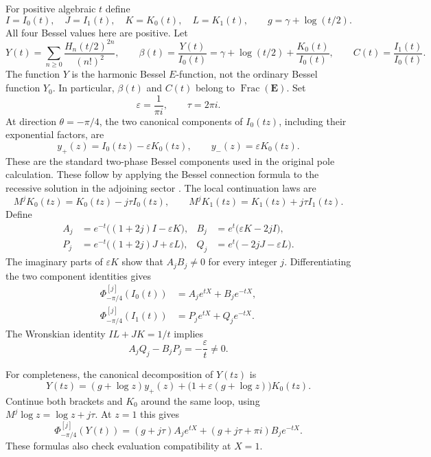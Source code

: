 \documentclass[11pt]{article}
\theoremstyle{definition}
\theoremstyle{remark}
\newcommand{\E}{\mathbf E}
\begin{document}
For positive algebraic $t$ define
\[
 I=I_0(t),\quad J=I_1(t),\quad K=K_0(t),\quad L=K_1(t),
 \qquad g=\gamma+\log(t/2).
\]
All four Bessel values here are positive.  Let
\[
 Y(t)=\sum_{n\ge0}\frac{H_n(t/2)^{2n}}{(n!)^2},
 \qquad \beta(t)=\frac{Y(t)}{I_0(t)}
              =\gamma+\log(t/2)+\frac{K_0(t)}{I_0(t)},
 \qquad C(t)=\frac{I_1(t)}{I_0(t)}.
\]
The function $Y$ is the harmonic Bessel $E$-function, not the
ordinary Bessel function $Y_0$.  In particular, $\beta(t)$ and
$C(t)$ belong to $\operatorname{Frac}(\E)$.
Set
\[
 \varepsilon=\frac1{\pi i},\qquad \tau=2\pi i.
\]
At direction $\theta=-\pi/4$, the two canonical components of
$I_0(tz)$, including their exponential factors, are
\[
 y_+(z)=I_0(tz)-\varepsilon K_0(tz),\qquad
 y_-(z)=\varepsilon K_0(tz).
\]
These are the standard two-phase Bessel components used in the
original pole calculation. These follow by applying the Bessel
connection formula to the recessive solution in the adjoining sector
\cite[Sections 10.27 and 10.34]{DLMF}. The local continuation laws are
\[
 M^jK_0(tz)=K_0(tz)-j\tau I_0(tz),\qquad
 M^jK_1(tz)=K_1(tz)+j\tau I_1(tz).
\]
Define
\begin{align*}
 A_j&=e^{-t}\bigl((1+2j)I-\varepsilon K\bigr),&
 B_j&=e^t\bigl(\varepsilon K-2jI\bigr),\\
 P_j&=e^{-t}\bigl((1+2j)J+\varepsilon L\bigr),&
 Q_j&=e^t\bigl(-2jJ-\varepsilon L\bigr).
\end{align*}
The imaginary parts of $\varepsilon K$ show that $A_jB_j\ne0$
for every integer $j$.  Differentiating the two component
identities gives
\begin{align}
 \Phi_{-\pi/4}^{[j]}(I_0(t))
      &=A_je^{tX}+B_je^{-tX},\label{mbc:Iimage}\\
 \Phi_{-\pi/4}^{[j]}(I_1(t))
      &=P_je^{tX}+Q_je^{-tX}.\label{mbc:Jimage}
\end{align}
The Wronskian identity $IL+JK=1/t$ implies
\begin{equation}\label{mbc:determinant}
 A_jQ_j-B_jP_j=-\frac{\varepsilon}{t}\ne0.
\end{equation}

For completeness, the canonical decomposition of $Y(tz)$ is
\[
 Y(tz)=(g+\log z)y_+(z)
       +\bigl(1+\varepsilon(g+\log z)\bigr)K_0(tz).
\]
Continue both brackets and $K_0$ around the same loop, using
$M^j\log z=\log z+j\tau$.  At $z=1$ this gives
\begin{equation}\label{mbc:Yimage}
 \Phi_{-\pi/4}^{[j]}(Y(t))
  =(g+j\tau)A_je^{tX}
   +(g+j\tau+\pi i)B_je^{-tX}.
\end{equation}
These formulas also check evaluation compatibility at $X=1$.
\end{document}
